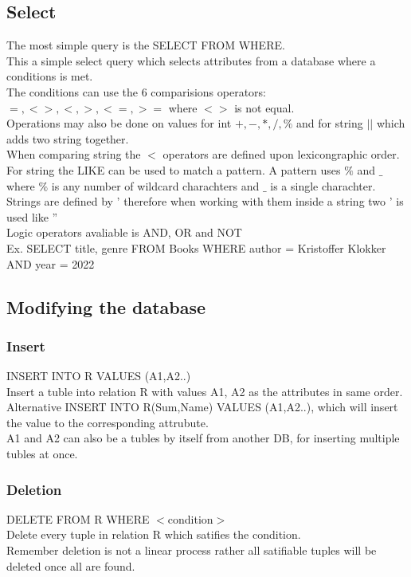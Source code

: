 \documentclass[12pt, a4paper]{article}
\begin{document}
		\subsection{Select}
			The most simple query is the SELECT FROM WHERE.\\
			This a simple select query which selects attributes from a database where a conditions is met.\\
			The conditions can use the 6 comparisions operators: $=,<>,<,>,<=,>=$ where $<>$ is not equal.\\
			Operations may also be done on values for int $+,-,*,/,\%$ and for string $||$ which adds two string together.\\
			When comparing string the $<$ operators are defined upon lexicongraphic order.\\
			For string the LIKE can be used to match a pattern. A pattern uses $\%$ and $\_$ where $\%$ is any number of wildcard charachters and $\_$ is a single charachter.\\
			Strings are defined by ' therefore when working with them inside a string two ' is used like ''\\
			Logic operators avaliable is AND, OR and NOT\\
			Ex. SELECT title, genre FROM Books WHERE author = Kristoffer Klokker AND year = 2022\\
		\subsection{Modifying the database}
			\subsubsection{Insert}
				INSERT INTO R VALUES (A1,A2..)\\
				Insert a tuble into relation R with values A1, A2 as the attributes in same order.\\
				Alternative INSERT INTO R(Sum,Name) VALUES (A1,A2..), which will insert the value to the corresponding attrubute.\\
				A1 and A2 can also be a tubles by itself from another DB, for inserting multiple tubles at once.
			\subsubsection{Deletion}
				DELETE FROM R WHERE $<$condition$>$\\
				Delete every tuple in relation R which satifies the condition.\\
				Remember deletion is not a linear process rather all satifiable tuples will be deleted once all are found.
\end{document}
